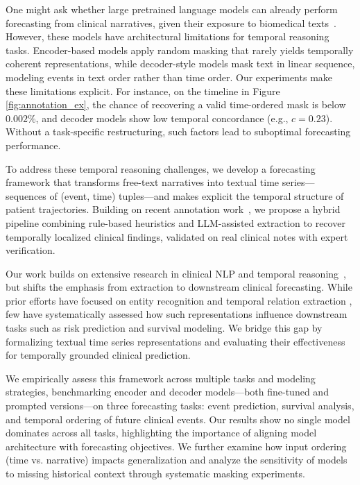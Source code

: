 \documentclass[letterpaper]{article} %
\begin{document}
One might ask whether large pretrained language models can already perform forecasting from clinical narratives, given their exposure to biomedical texts~\citep{peng2020empirical,weber2024redpajama}. However, these models have architectural limitations for temporal reasoning tasks. Encoder-based models apply random masking that rarely yields temporally coherent representations, while decoder-style models mask text in linear sequence, modeling events in text order rather than time order. 
Our experiments make these limitations explicit. For instance, on the timeline in Figure \ref{fig:annotation_ex}, the chance of recovering a valid time-ordered mask is below $0.002\%$, and decoder models show low temporal concordance (e.g., $c=0.23$). Without a task-specific restructuring, such factors lead to suboptimal forecasting performance.

To address these temporal reasoning challenges, we develop a forecasting framework that
transforms free-text narratives into textual time series---sequences of (event, time) tuples---and makes explicit the temporal structure of patient trajectories. Building on recent annotation work~\citep{wang2025large,noroozizadeh2025pmoa}, we propose a hybrid pipeline combining rule-based heuristics and LLM-assisted extraction to recover temporally localized clinical findings, validated on real clinical notes with expert verification.

Our work builds on extensive research in clinical NLP and temporal reasoning~\citep{kohane1987temporal, leeuwenberg2020towards, cheng2023typed}, but shifts the emphasis from extraction to downstream clinical forecasting. While prior efforts have focused on entity recognition and temporal relation extraction \citep{zhou2007temporal, uzuner20112010, sun2013evaluating}, few have systematically assessed how such representations influence downstream tasks such as risk prediction and survival modeling. We bridge this gap by formalizing textual time series representations and evaluating their effectiveness for temporally grounded clinical prediction.

We empirically assess this framework across multiple tasks and modeling strategies, benchmarking encoder and decoder models—both fine-tuned and prompted versions—on three forecasting tasks: event prediction, survival analysis, and temporal ordering of future clinical events. Our results show no single model dominates across all tasks, highlighting the importance of aligning model architecture with forecasting objectives. We further examine how input ordering (time vs. narrative) impacts generalization and analyze the sensitivity of models to missing historical context through systematic masking experiments.
\end{document}
